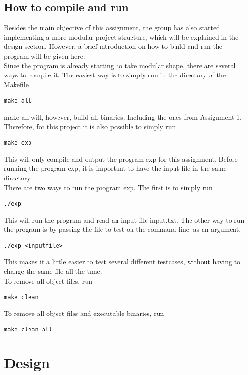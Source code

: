 \documentclass[a4paper,10pt,titlepage]{report}
\begin{document}
\subsection{How to compile and run}
Besides the main objective of this assignment, the group has also started implementing a more modular project structure, which will be explained in the design section. However, a brief introduction on how to build and run the program will be given here.\\
\vspace{6px}
Since the program is already starting to take modular shape, there are several ways to compile it. The easiest way is to simply run in the directory of the \textsf{Makefile}
\begin{lstlisting}
make all
\end{lstlisting}
\textsf{make all} will, however, build all binaries. Including the ones from Assignment 1. Therefore, for this project it is also possible to simply run
\begin{lstlisting}
make exp
\end{lstlisting}
This will only compile and output the program \textsf{exp} for this assignment. Before running the program \textsf{exp}, it is important to have the input file in the same directory.\\
\vspace{6px}
There are two ways to run the program \textsf{exp}. The first is to simply run
\begin{lstlisting}
./exp
\end{lstlisting}
This will run the program and read an input file \textsf{input.txt}. The other way to run the program is by passing the file to test on the command line, as an argument.
\begin{lstlisting}
./exp <inputfile>
\end{lstlisting}
This makes it a little easier to test several different testcases, without having to change the same file all the time.\\
\vspace{6px}
To remove all object files, run
\begin{lstlisting}
make clean
\end{lstlisting}
To remove all object files and executable binaries, run
\begin{lstlisting}
make clean-all
\end{lstlisting}

\section{Design} %
\end{document}

